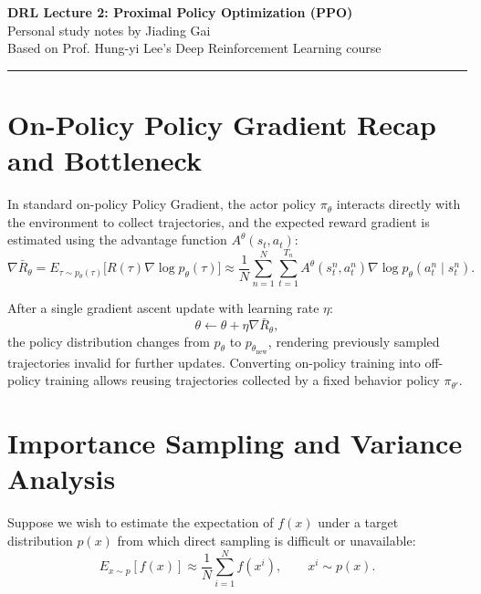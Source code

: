 \documentclass[11pt, a4paper]{article}
\begin{document}
\begin{center}
    {\LARGE \textbf{\textcolor{accent}{DRL Lecture 2: Proximal Policy Optimization (PPO)}}}\\[6pt]
    {\large Personal study notes by Jiading Gai}\\[4pt]
    {\small \textcolor{muted}{Based on Prof. Hung-yi Lee's Deep Reinforcement Learning course}}
\end{center}

\vspace{6pt}
\hrule
\vspace{12pt}

\section{On-Policy Policy Gradient Recap and Bottleneck}

In standard on-policy Policy Gradient, the actor policy $\pi_\theta$ interacts directly with the environment to collect trajectories, and the expected reward gradient is estimated using the advantage function $A^\theta(s_t, a_t)$:
\begin{equation}\label{eq:ppo-policy-gradient}
    \nabla \bar{R}_\theta = E_{\tau \sim p_\theta(\tau)}\big[R(\tau) \nabla \log p_\theta(\tau)\big] \approx \frac{1}{N} \sum_{n=1}^{N} \sum_{t=1}^{T_n} A^\theta(s_t^n, a_t^n) \nabla \log p_\theta(a_t^n \mid s_t^n).
\end{equation}

After a single gradient ascent update with learning rate $\eta$:
\begin{equation}\label{eq:ppo-gradient-ascent}
    \theta \leftarrow \theta + \eta \nabla \bar{R}_\theta,
\end{equation}
the policy distribution changes from $p_\theta$ to $p_{\theta_{\text{new}}}$, rendering previously sampled trajectories invalid for further updates. Converting on-policy training into off-policy training allows reusing trajectories collected by a fixed behavior policy $\pi_{\theta'}$.

\section{Importance Sampling and Variance Analysis}

Suppose we wish to estimate the expectation of $f(x)$ under a target distribution $p(x)$ from which direct sampling is difficult or unavailable:
\begin{equation}\label{eq:ppo-monte-carlo-expectation}
    E_{x \sim p}[f(x)] \approx \frac{1}{N} \sum_{i=1}^{N} f(x^i), \qquad x^i \sim p(x).
\end{equation}
\end{document}
